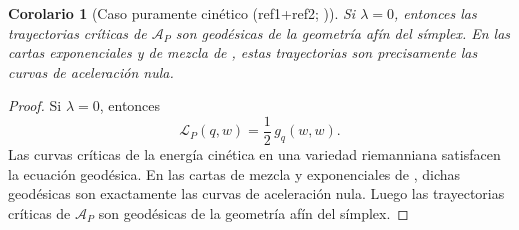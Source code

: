 ﻿\documentclass[12pt]{article}
\newtheorem{corolario}{Corolario}[section]
\begin{document}
\begin{corolario}[Caso puramente cinético \textnormal{(ref1+ref2; \citealp{PistoneShoaib2024Axioms,Pistone2018Lagrangian})}]
Si \(\lambda=0\), entonces las trayectorias críticas de \(\mathcal A_P\) son geodésicas de la geometría afín del símplex. En las cartas exponenciales y de mezcla de \cite{PistoneShoaib2024Axioms}, estas trayectorias son precisamente las curvas de aceleración nula.
\end{corolario}
\begin{proof}
Si \(\lambda=0\), entonces
\[
\mathcal L_P(q,w)=\frac12\,g_q(w,w).
\]
Las curvas críticas de la energía cinética en una variedad riemanniana satisfacen la ecuación geodésica. En las cartas de mezcla y exponenciales de \cite{PistoneShoaib2024Axioms}, dichas geodésicas son exactamente las curvas de aceleración nula. Luego las trayectorias críticas de \(\mathcal A_P\) son geodésicas de la geometría afín del símplex.
\end{proof}
\end{document}
